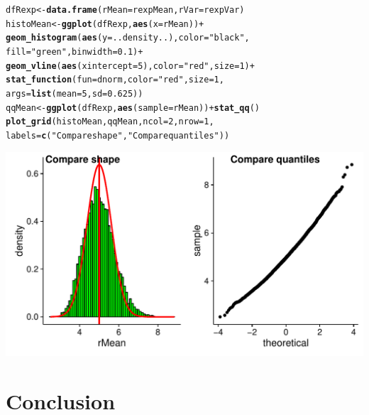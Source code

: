 \documentclass[a4paper, 10pt]{article}\usepackage[]{graphicx}\usepackage[]{color}
\makeatletter
\def\maxwidth{ %
  \ifdim\Gin@nat@width>\linewidth
    \linewidth
  \else
    \Gin@nat@width
  \fi
}
\newcommand{\hlnum}[1]{\textcolor[rgb]{0.686,0.059,0.569}{#1}}%
\newcommand{\hlstr}[1]{\textcolor[rgb]{0.192,0.494,0.8}{#1}}%
\newcommand{\hlopt}[1]{\textcolor[rgb]{0,0,0}{#1}}%
\newcommand{\hlstd}[1]{\textcolor[rgb]{0.345,0.345,0.345}{#1}}%
\newcommand{\hlkwb}[1]{\textcolor[rgb]{0.69,0.353,0.396}{#1}}%
\newcommand{\hlkwc}[1]{\textcolor[rgb]{0.333,0.667,0.333}{#1}}%
\newcommand{\hlkwd}[1]{\textcolor[rgb]{0.737,0.353,0.396}{\textbf{#1}}}%
\newenvironment{kframe}{%
 \def\at@end@of@kframe{}%
 \ifinner\ifhmode%
  \def\at@end@of@kframe{\end{minipage}}%
  \begin{minipage}{\columnwidth}%
 \fi\fi%
 \def\FrameCommand##1{\hskip\@totalleftmargin \hskip-\fboxsep
 \colorbox{shadecolor}{##1}\hskip-\fboxsep
     \hskip-\linewidth \hskip-\@totalleftmargin \hskip\columnwidth}%
 \MakeFramed {\advance\hsize-\width
   \@totalleftmargin\z@ \linewidth\hsize
   \@setminipage}}%
 {\par\unskip\endMakeFramed%
 \at@end@of@kframe}
\newenvironment{knitrout}{}{} %
\makeatother
\begin{document}
\begin{knitrout}\small
{}\color{fgcolor}\begin{kframe}
\begin{alltt}
\hlstd{dfRexp}  \hlkwb{<-} \hlkwd{data.frame}\hlstd{(}\hlkwc{rMean}\hlstd{=rexpMean,} \hlkwc{rVar}\hlstd{=rexpVar)}
\hlstd{histoMean} \hlkwb{<-} \hlkwd{ggplot}\hlstd{(dfRexp,} \hlkwd{aes}\hlstd{(}\hlkwc{x}\hlstd{=rMean))} \hlopt{+}
    \hlkwd{geom_histogram}\hlstd{(}\hlkwd{aes}\hlstd{(}\hlkwc{y}\hlstd{=..density..),} \hlkwc{color}\hlstd{=}\hlstr{"black"}\hlstd{,}
                   \hlkwc{fill}\hlstd{=}\hlstr{"green"}\hlstd{,} \hlkwc{binwidth}\hlstd{=}\hlnum{0.1}\hlstd{)} \hlopt{+}
    \hlkwd{geom_vline}\hlstd{(}\hlkwd{aes}\hlstd{(}\hlkwc{xintercept}\hlstd{=}\hlnum{5}\hlstd{),} \hlkwc{color}\hlstd{=}\hlstr{"red"}\hlstd{,} \hlkwc{size}\hlstd{=}\hlnum{1}\hlstd{)} \hlopt{+}
    \hlkwd{stat_function}\hlstd{(}\hlkwc{fun}\hlstd{=dnorm,} \hlkwc{color}\hlstd{=}\hlstr{"red"}\hlstd{,} \hlkwc{size}\hlstd{=}\hlnum{1}\hlstd{,}
                  \hlkwc{args}\hlstd{=}\hlkwd{list}\hlstd{(}\hlkwc{mean}\hlstd{=}\hlnum{5}\hlstd{,} \hlkwc{sd}\hlstd{=}\hlnum{0.625}\hlstd{))}
\hlstd{qqMean} \hlkwb{<-} \hlkwd{ggplot}\hlstd{(dfRexp,} \hlkwd{aes}\hlstd{(}\hlkwc{sample}\hlstd{=rMean))} \hlopt{+} \hlkwd{stat_qq}\hlstd{()}
\hlkwd{plot_grid}\hlstd{(histoMean, qqMean,} \hlkwc{ncol}\hlstd{=}\hlnum{2}\hlstd{,} \hlkwc{nrow}\hlstd{=}\hlnum{1}\hlstd{,}
          \hlkwc{labels}\hlstd{=}\hlkwd{c}\hlstd{(}\hlstr{"Compare shape"}\hlstd{,}\hlstr{"Compare quantiles"}\hlstd{))}
\end{alltt}
\end{kframe}
\includegraphics[width=\maxwidth]{figure/plots-1} 

\end{knitrout}
\section{Conclusion}
\end{document}

